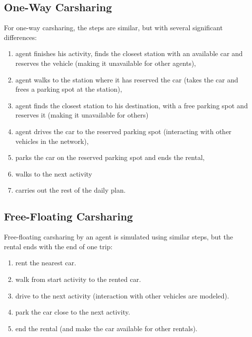 \subsection{One-Way Carsharing}
For one-way carsharing, the steps are similar, but with several significant differences:
\begin{enumerate}
	\item agent finishes his activity, finds the closest station with an available car and reserves the vehicle (making it unavailable for other agents),
	\item agent walks to the station where it has reserved the car (takes the car and frees a parking spot at the station),
	\item agent finds the closest station to his destination, with a free parking spot and reserves it (making it unavailable for others)
	\item agent drives the car to the reserved parking spot (interacting with other vehicles in the network),
	\item parks the car on the reserved parking spot and ends the rental,
	\item walks to the next activity
	\item carries out the rest of the daily plan.
\end{enumerate}

\subsection{Free-Floating Carsharing}
 Free-floating carsharing by an agent is simulated using similar steps, but the rental ends with the end of one trip:
\begin{enumerate}
	\item rent the nearest car.
	\item	walk from start activity to the rented car.
	\item	drive to the next activity (interaction with other vehicles are modeled).
	\item	park the car close to the next activity.
	\item	end the rental (and make the car available for other rentals).
\end{enumerate}

